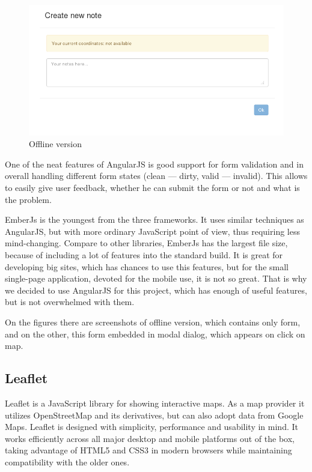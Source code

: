 \documentclass[12pt,a4paper]{article}
\begin{document}
\begin{figure}[h]
  \begin{center}
    \includegraphics[width=\textwidth]{res/offline}
  \end{center}
  \caption{Offline version}
\end{figure}

One of the neat features of AngularJS is good support for form validation and in
overall handling different form states (clean --- dirty, valid --- invalid).
This allows to easily give user feedback, whether he can submit the form or not
and what is the problem.

EmberJs is the youngest from the three frameworks. It uses similar techniques
as AngularJS, but with more ordinary JavaScript point of view, thus requiring
less mind-changing. Compare to other libraries, EmberJs has the largest file size,
because of including a lot of features into the standard build. It is great for
developing big sites, which has chances to use this features, but for the small
single-page application, devoted for the mobile use, it is not so great. That is
why we decided to use AngularJS for this project, which has enough of useful
features, but is not overwhelmed with them.

On the figures there are screenshots of offline version, which contains only form,
and on the other, this form embedded in modal dialog, which appears on click on map.

\subsection{Leaflet}

Leaflet is a JavaScript library for showing interactive maps. As a map
provider it utilizes OpenStreetMap and its derivatives, but can also
adopt data from Google Maps. Leaflet is designed with simplicity,
performance and usability in mind. It works efficiently across all
major desktop and mobile platforms out of the box, taking advantage of
HTML5 and CSS3 in modern browsers while maintaining compatibility with
the older ones.
\end{document}
